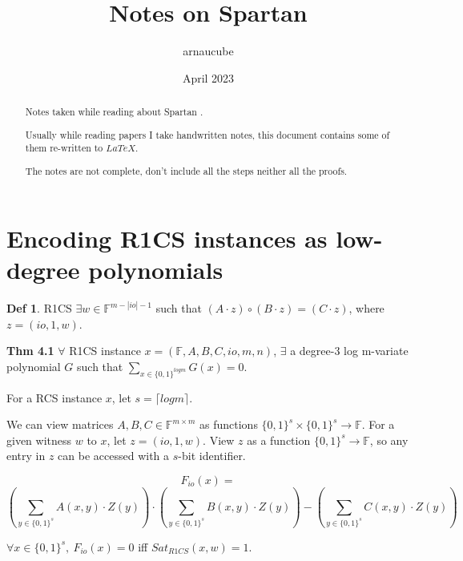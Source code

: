 \documentclass{article}
\title{Notes on Spartan}
\author{arnaucube}
\date{April 2023}
\theoremstyle{definition}
\newtheorem{definition}{Def}[section]
\newtheorem{theorem}[definition]{Thm}
\newenvironment{lemma}[1]
{\renewcommand\theinnerlemma{#1}\innerlemma}
{\endinnerlemma}
\begin{document}
\maketitle

\begin{abstract}
	Notes taken while reading about Spartan \cite{cryptoeprint:2019/550}.

	Usually while reading papers I take handwritten notes, this document contains some of them re-written to $LaTeX$.

	The notes are not complete, don't include all the steps neither all the proofs.
\end{abstract}

\tableofcontents

\section{Encoding R1CS instances as low-degree polynomials}
\begin{definition}{R1CS}
	$\exists w \in \mathbb{F}^{m - |io| - 1}$ such that $(A \cdot z) \circ (B \cdot z) = (C \cdot z)$, where $z=(io, 1, w)$.
\end{definition}


\textbf{Thm 4.1} $\forall$ R1CS instance $x = (\mathbb{F}, A, B, C, io, m, n)$, $\exists$ a degree-3 log m-variate polynomial $G$ such that $\sum_{x \in \{0,1\}^{log m}} G(x) = 0$.
\vspace{0.5cm}

For a RCS instance $x$, let $s = \lceil log m \rceil$.

We can view matrices $A, B, C \in \mathbb{F}^{m \times m}$ as functions $\{0,1\}^s \times \{0,1\}^s \rightarrow \mathbb{F}$.
For a given witness $w$ to $x$, let $z=(io, 1, w)$.
View $z$ as a function $\{0,1\}^s \rightarrow \mathbb{F}$, so any entry in $z$ can be accessed with a $s$-bit identifier.

$$
F_{io}(x)=
$$
$$
\left( \sum_{y \in \{0,1\}^s} A(x, y) \cdot Z(y) \right) \cdot \left( \sum_{y \in \{0,1\}^s} B(x, y) \cdot Z(y) \right) - \left( \sum_{y \in \{0,1\}^s} C(x, y) \cdot Z(y) \right)
$$

\begin{lemma}{4.1}
	$\forall x \in \{0,1\}^s,~ F_{io}(x)=0$ iff $Sat_{R1CS}(x,w)=1$.
\end{lemma}
\end{document}
